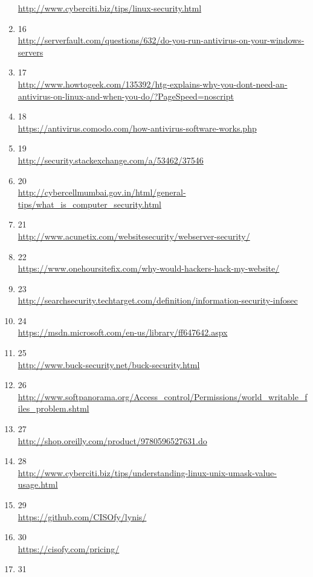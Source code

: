 \documentclass[12pt]{article}
\begin{document}
\begin{sloppypar}
\begin{enumerate}
	\url{http://www.cyberciti.biz/tips/linux-security.html}
\item 16 \\
	\url{http://serverfault.com/questions/632/do-you-run-antivirus-on-your-windows-servers}
\item 17 \\
	\url{http://www.howtogeek.com/135392/htg-explains-why-you-dont-need-an-antivirus-on-linux-and-when-you-do/?PageSpeed=noscript}
\item 18 \\
	\url{https://antivirus.comodo.com/how-antivirus-software-works.php}
\item 19 \\
	\url{http://security.stackexchange.com/a/53462/37546}
\item 20 \\
	\url{http://cybercellmumbai.gov.in/html/general-tips/what\_is\_computer\_security.html}
\item 21 \\
	\url{http://www.acunetix.com/websitesecurity/webserver-security/}
\item 22 \\
	\url{https://www.onehoursitefix.com/why-would-hackers-hack-my-website/}
\item 23 \\
	\url{http://searchsecurity.techtarget.com/definition/information-security-infosec}
\item 24 \\
	\url{https://msdn.microsoft.com/en-us/library/ff647642.aspx}
\item 25 \\
	\url{http://www.buck-security.net/buck-security.html}
\item 26 \\
	\url{http://www.softpanorama.org/Access\_control/Permissions/world\_writable\_files\_problem.shtml}
\item 27 \\
	\url{http://shop.oreilly.com/product/9780596527631.do}
\item 28 \\
	\url{http://www.cyberciti.biz/tips/understanding-linux-unix-umask-value-usage.html}
\item 29 \\
	\url{https://github.com/CISOfy/lynis/}
\item 30 \\
	\url{https://cisofy.com/pricing/}
\item 31 \\

\end{enumerate}
\end{sloppypar}
\end{document}
